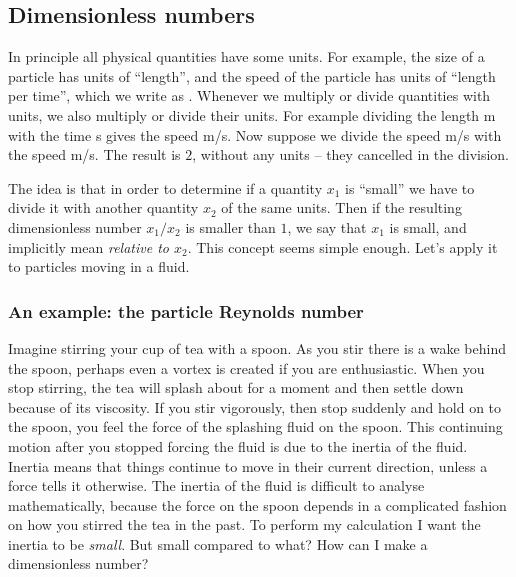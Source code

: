 \documentclass[thesis.tex]{subfiles}
\begin{document}
\subsection*{Dimensionless numbers}

In principle all physical quantities have some units. For example, the size of a particle has units of ``length'', and the speed of the particle has units of ``length per time'', which we write as . Whenever we multiply or divide quantities with units, we also multiply or divide their units. For example dividing the length \unit[20]{m} with the time \unit[5]{s} gives the speed \unit[4]{m/s}. Now suppose we divide the speed \unit[4]{m/s} with the speed \unit[2]{m/s}. The result is $2$, without any units -- they cancelled in the division.

The idea is that in order to determine if a quantity $x_1$ is ``small'' we have to divide it with another quantity $x_2$ of the same units. Then if the resulting dimensionless number $x_1/x_2$ is smaller than $1$, we say that $x_1$ is small, and implicitly mean \emph{relative to $x_2$}. This concept seems simple enough. Let's apply it to particles moving in a fluid.

\subsubsection*{An example: the particle Reynolds number}

Imagine stirring your cup of tea with a spoon. As you stir there is a wake behind the spoon, perhaps even a vortex is created if you are enthusiastic. When you stop stirring, the tea will splash about for a moment and then settle down because of its viscosity. If you stir vigorously, then stop suddenly and hold on to the spoon, you feel the force of the splashing fluid on the spoon. This continuing motion after you stopped forcing the fluid is due to the inertia of the fluid. Inertia means that things continue to move in their current direction, unless a force tells it otherwise. The inertia of the fluid is difficult to analyse mathematically, because the force on the spoon depends in a complicated fashion on how you stirred the tea in the past. To perform my calculation I want the inertia to be \emph{small}. But small compared to what? How can I make a dimensionless number?
\end{document}
